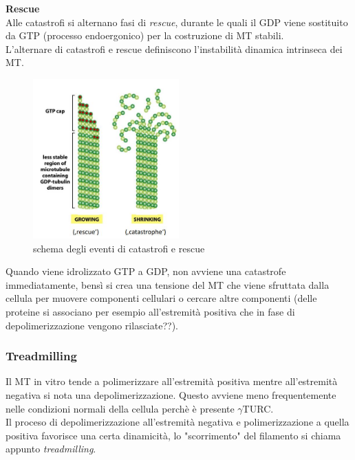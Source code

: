             \textbf{Rescue}\\
                Alle catastrofi si alternano fasi di \textit{rescue}, durante le quali il GDP viene sostituito da GTP (processo endoergonico) per la costruzione di MT stabili.\\
            L'alternare di catastrofi e rescue definiscono l'instabilità dinamica intrinseca dei MT.
            \begin{figure}[h]
                    \centering
                    \includegraphics[width=0.5\textwidth]{images/rescue_catastrofe.JPG}
                    \caption{\small schema degli eventi di catastrofi e rescue}
                    \label{fig:mesh1}
            \end{figure}
            Quando viene idrolizzato GTP a GDP, non avviene una catastrofe immediatamente, bensì si crea una tensione del MT che viene sfruttata dalla cellula per muovere componenti cellulari o cercare altre componenti (delle proteine si associano per esempio all'estremità positiva che in fase di depolimerizzazione vengono rilasciate??).
                
        \subsubsection{Treadmilling}
            Il MT in vitro tende a polimerizzare all'estremità positiva mentre all'estremità negativa si nota una depolimerizzazione. Questo avviene meno frequentemente nelle condizioni normali della cellula perchè è presente $\gamma$TURC.\\
            Il proceso di depolimerizzazione all'estremità negativa e polimerizzazione a quella positiva favorisce una certa dinamicità, lo "scorrimento" del filamento si chiama appunto \textit{treadmilling}.
            
